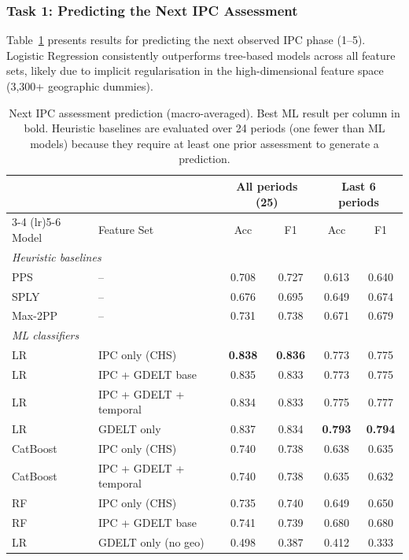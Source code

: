 \documentclass{article}
\begin{document}
\subsubsection{Task 1: Predicting the Next IPC Assessment}

Table~\ref{tab:next_ipc} presents results for predicting the next observed IPC phase (1--5). Logistic Regression consistently outperforms tree-based models across all feature sets, likely due to implicit regularisation in the high-dimensional feature space (3,300+ geographic dummies).

\begin{table}[H]
\centering
\small
\caption{Next IPC assessment prediction (macro-averaged). Best ML result per column in bold. Heuristic baselines are evaluated over 24 periods (one fewer than ML models) because they require at least one prior assessment to generate a prediction.}
\label{tab:next_ipc}
\begin{tabular}{ll cccc}
\toprule
& & \multicolumn{2}{c}{All periods (25)} & \multicolumn{2}{c}{Last 6 periods} \\
\cmidrule(lr){3-4} \cmidrule(lr){5-6}
Model & Feature Set & Acc & F1 & Acc & F1 \\
\midrule
\multicolumn{6}{l}{\textit{Heuristic baselines}} \\
PPS & -- & 0.708 & 0.727 & 0.613 & 0.640 \\
SPLY & -- & 0.676 & 0.695 & 0.649 & 0.674 \\
Max-2PP & -- & 0.731 & 0.738 & 0.671 & 0.679 \\
\midrule
\multicolumn{6}{l}{\textit{ML classifiers}} \\
LR & IPC only (CHS) & \textbf{0.838} & \textbf{0.836} & 0.773 & 0.775 \\
LR & IPC + GDELT base & 0.835 & 0.833 & 0.773 & 0.775 \\
LR & IPC + GDELT + temporal & 0.834 & 0.833 & 0.775 & 0.777 \\
LR & GDELT only & 0.837 & 0.834 & \textbf{0.793} & \textbf{0.794} \\
CatBoost & IPC only (CHS) & 0.740 & 0.738 & 0.638 & 0.635 \\
CatBoost & IPC + GDELT + temporal & 0.740 & 0.738 & 0.635 & 0.632 \\
RF & IPC only (CHS) & 0.735 & 0.740 & 0.649 & 0.650 \\
RF & IPC + GDELT base & 0.741 & 0.739 & 0.680 & 0.680 \\
LR & GDELT only (no geo) & 0.498 & 0.387 & 0.412 & 0.333 \\
\bottomrule
\end{tabular}
\end{table}
\end{document}

